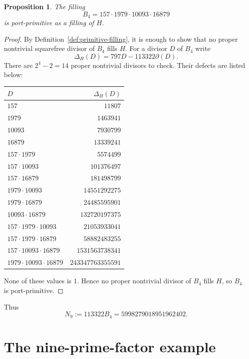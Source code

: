 \documentclass[11pt]{amsart}
\theoremstyle{plain}
\newtheorem{proposition}[theorem]{Proposition}
\theoremstyle{definition}
\theoremstyle{remark}
\newcommand{\D}{\Delta}
\newcommand{\dd}{\partial}
\begin{document}
\begin{proposition}\label{prop:H-B4-primitive}
The filling
\[
        B_4=157\cdot1979\cdot10093\cdot16879
\]
is port-primitive as a filling of $H$.
\end{proposition}

\begin{proof}
By Definition~\ref{def:primitive-filling}, it is enough to show that no proper nontrivial squarefree divisor of $B_4$ fills $H$.  For a divisor $D$ of $B_4$ write
\[
        \D_H(D)=797D-113322\dd(D).
\]
There are $2^4-2=14$ proper nontrivial divisors to check.  Their defects are listed below:
\begin{center}
\small
\begin{tabular}{lr}
\toprule
$D$ & $\D_H(D)$ \\
\midrule
$157$ & $11807$ \\
$1979$ & $1463941$ \\
$10093$ & $7930799$ \\
$16879$ & $13339241$ \\
$157\cdot1979$ & $5574499$ \\
$157\cdot10093$ & $101376497$ \\
$157\cdot16879$ & $181498799$ \\
$1979\cdot10093$ & $14551292275$ \\
$1979\cdot16879$ & $24485595901$ \\
$10093\cdot16879$ & $132720197375$ \\
$157\cdot1979\cdot10093$ & $21053933041$ \\
$157\cdot1979\cdot16879$ & $58882483255$ \\
$157\cdot10093\cdot16879$ & $1531563738341$ \\
$1979\cdot10093\cdot16879$ & $243347763355591$ \\
\bottomrule
\end{tabular}
\end{center}
None of these values is $1$.  Hence no proper nontrivial divisor of $B_4$ fills $H$, so $B_4$ is port-primitive.
\end{proof}

Thus
\begin{equation}\label{eq:N9-def}
        N_9:=113322B_4=5998279018951962402.
\end{equation}

\section{The nine-prime-factor example}
\end{document}
